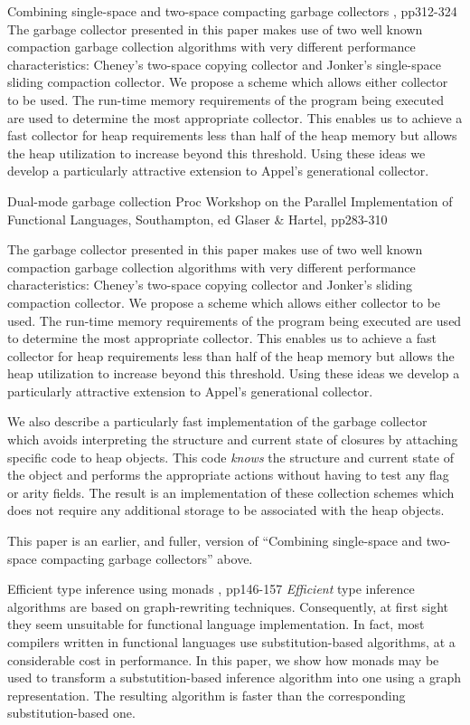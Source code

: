 {Combining single-space and two-space compacting garbage collectors}
{\GlasgowNinetyOne{}, pp312-324}
{The garbage collector presented in this paper makes use of
two well known compaction garbage collection algorithms with very
different performance characteristics: Cheney's two-space copying
collector and Jon\-ker's single-space sliding compaction collector. We
propose a scheme which allows either collector to be used. The
run-time memory requirements of the program being executed are used to
determine the most appropriate collector. This enables us to achieve a
fast collector for heap requirements less than half of the heap memory
but allows the heap utilization to increase beyond this threshold.
Using these ideas we develop a particularly attractive extension to
Appel's generational collector.
}

{Dual-mode garbage collection}
{Proc Workshop on the Parallel Implementation of Functional Languages, Southampton, 
ed Glaser \& Hartel, pp283-310}
{
The garbage collector presented in this paper makes use of two well
known compaction garbage collection algorithms with very different
performance characteristics: Cheney's two-space copying collector and
Jonker's sliding compaction collector. We propose a scheme which
allows either collector to be used. The run-time memory requirements
of the program being executed are used to determine the most
appropriate collector. This enables us to achieve a fast collector for
heap requirements less than half of the heap memory but allows the
heap utilization to increase beyond this threshold. Using these ideas
we develop a particularly attractive extension to Appel's generational
collector. 

We also describe a particularly fast implementation of the garbage
collector which avoids interpreting the structure and current state of
closures by attaching specific code to heap objects. This code {\em
knows} the structure and current state of the object and performs the
appropriate actions without having to test any flag or arity fields.
The result is an implementation of these collection schemes which does
not require any additional storage to be associated with the heap
objects.

This paper is an earlier, and fuller, version of ``Combining
single-space and two-space compacting garbage collectors'' above.
}

{Efficient type inference using monads}
{\GlasgowNinetyOne{}, pp146-157}
{{\em Efficient} type inference algorithms are based on
graph-rewriting techniques.  Consequently, at first sight they seem
unsuitable for functional language implementation.  In fact, most
compilers written in functional languages use substitution-based
algorithms, at a considerable cost in performance.  In this paper, we
show how monads may be used to transform a substutition-based inference
algorithm into one using a graph representation.  The resulting
algorithm is faster than the corresponding substitution-based one.}


